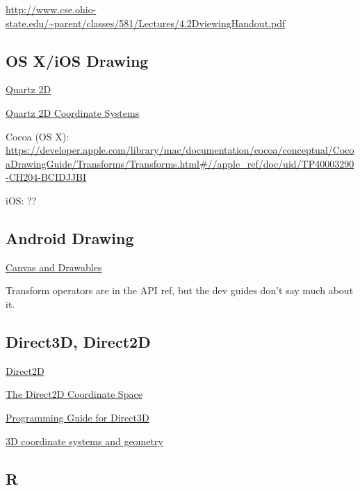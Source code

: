 \documentclass[12pt]{tufte-handout}
\numberwithin{equation}{subsection}
\numberwithin{equation}{subsection}
\begin{document}
{\begin{appendices}
    \url{http://www.cse.ohio-state.edu/~parent/classes/581/Lectures/4.2DviewingHandout.pdf}

    \subsection{OS X/iOS Drawing}

    \href{https://developer.apple.com/library/mac/documentation/graphicsimaging/conceptual/drawingwithquartz2d/dq\_overview/dq\_overview.html}{Quartz 2D}

    \href{https://developer.apple.com/library/mac/documentation/graphicsimaging/conceptual/drawingwithquartz2d/dq\_overview/dq\_overview.html#//apple\_ref/doc/uid/TP30001066-CH202-CJBBAEEC}{Quartz 2D Coordinate Systems}

    Cocoa (OS X):  \url{https://developer.apple.com/library/mac/documentation/cocoa/conceptual/CocoaDrawingGuide/Transforms/Transforms.html#//apple\_ref/doc/uid/TP40003290-CH204-BCIDJJBI}

    iOS:  ??

    \subsection{Android Drawing}

    \href{http://developer.android.com/guide/topics/graphics/2d-graphics.html}{Canvas and Drawables}

    Transform operators are in the API ref, but the dev guides don't say much about it.

    \subsection{Direct3D, Direct2D}
    \label{subs:direct3d}


    \href{http://msdn.microsoft.com/en-us/library/dd370990%28VS.85%29.aspx}{Direct2D}

      \href{http://msdn.microsoft.com/en-us/library/dd756655(v=vs.85).aspx#the_direct2d_coordinate_space}{The Direct2D Coordinate Space}

      \href{http://msdn.microsoft.com/en-us/library/windows/desktop/ff476345(v=vs.85).aspx}{Programming Guide for Direct3D}

      \href{http://msdn.microsoft.com/en-us/library/windows/desktop/bb324489(v=vs.85).aspx}{3D coordinate systems and geometry}

      \subsection{R}
      \label{subs:r}


\end{appendices}}
\end{document}
